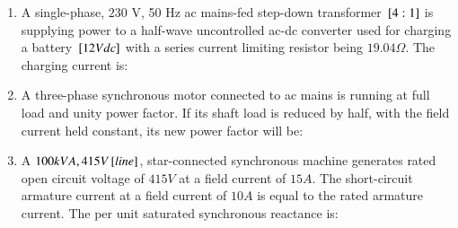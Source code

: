\documentclass[journal]{IEEEtran}
\begin{document}
\begin{enumerate}
\begin{enumerate}
\end{enumerate}
\item A single-phase, $230$ V, 50 Hz ac mains-fed step-down transformer ${}\left[4:1\right]$ is supplying power to a half-wave uncontrolled ac-dc converter used for charging a battery ${}\left[12 V dc\right]$ with a series current limiting resistor being $19.04 \Omega$. The charging current is:
\begin{enumerate}
\end{enumerate}
\item A three-phase synchronous motor connected to ac mains is running at full load and unity power factor. If its shaft load is reduced by half, with the field current held constant, its new power factor will be:
\begin{enumerate}
\end{enumerate}
\item A $100 kVA, 415 V {}\left[line\right]$, star-connected synchronous machine generates rated open circuit voltage of $415 V$ at a field current of $15 A$. The short-circuit armature current at a field current of $10 A$ is equal to the rated armature current. The per unit saturated synchronous reactance is:

\end{enumerate}
\end{document}
